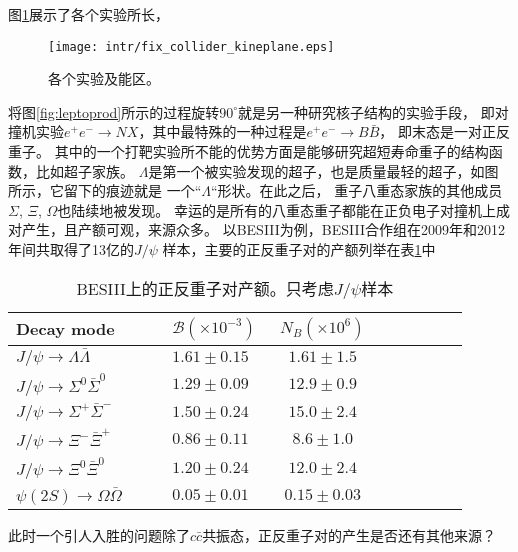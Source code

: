 图\ref{fig:fix_collider_kineplane}展示了各个实验所长，
\begin{figure}[htpb]
    \centering
    \texttt{[image: intr/fix\_collider\_kineplane.eps]}
    \caption{各个实验及能区。}%
    \label{fig:fix_collider_kineplane}
\end{figure}
将图\ref{fig:leptoprod}所示的过程旋转$90^{\circ}$就是另一种研究核子结构的实验手段，
即对撞机实验$e^{+} e^{-} \to N X$，其中最特殊的一种过程是$ e^+ e^- \to B \bar{B}$，
即末态是一对正反重子。
其中的一个打靶实验所不能的优势方面是能够研究超短寿命重子的结构函数，比如超子家族。
$\Lambda$是第一个被实验发现的超子，也是质量最轻的超子，如图所示，它留下的痕迹就是
一个``$\Lambda$``形状。在此之后，
重子八重态家族的其他成员$\Sigma$, $\Xi$, $\Omega$也陆续地被发现。
幸运的是所有的八重态重子都能在正负电子对撞机上成对产生，且产额可观，来源众多。
以BESIII为例，BESIII合作组在2009年和2012年间共取得了13亿的$J/\psi$
样本，主要的正反重子对的产额列举在表\ref{tab:bbar_production}中
 \begin{table}[htpb]
     \caption{BESIII上的正反重子对产额。只考虑$J/\psi$样本}%
     \label{tab:bbar_production}
     \centering
     \begin{tabular}{p{0.4\linewidth}
         p{0.25\linewidth}<{\centering}c
         p{0.25\linewidth}<{\centering}c }
         \toprule[0.2em]
         Decay mode & $\mathcal{B}(\times 10^{-3})$ & $N_{B} (\times
         10^{6})$ \\
         \midrule
         $J/\psi \to \Lambda \bar{\Lambda}$ & $1.61 \pm 0.15$ &
         $1.61 \pm 1.5$ \\
         $J/\psi \to \Sigma^{0} \bar{\Sigma}^{0}$ & $1.29 \pm 0.09$ &
         $12.9 \pm 0.9$ \\

         $J/\psi \to \Sigma^{+} \bar{\Sigma}^{-}$ & $1.50 \pm 0.24$ &
         $15.0 \pm 2.4$ \\

         $J/\psi \to \Xi^{-} \bar{\Xi}^{+}$ & $0.86 \pm 0.11$ &
         $8.6 \pm 1.0$ \\

         $J/\psi \to \Xi^{0} \bar{\Xi}^{0}$ & $1.20 \pm 0.24$ &
         $12.0 \pm 2.4$ \\
         $\psi(2S) \to \Omega \bar{\Omega} $ & $0.05 \pm 0.01$ &
         $0.15 \pm 0.03$ \\
         \bottomrule
     \end{tabular}
\end{table}
此时一个引人入胜的问题除了$c\bar{c}$共振态，正反重子对的产生是否还有其他来源？
